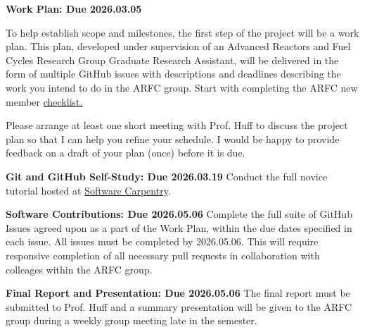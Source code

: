 \documentclass[11pt, answers]{exam}
\newcommand{\duedate}{2026.05.06}
\begin{document}
\begin{questions}
\addpoints
\question[10] \textbf{Work Plan: Due 2026.03.05}

To help establish scope and milestones, the first step of the project will be a 
        work plan. This plan, developed under supervision of an Advanced 
        Reactors and Fuel Cycles Research Group Graduate Research 
        Assistant, will be delivered in the form of multiple GitHub 
        issues with descriptions and deadlines describing the work you intend 
        to do in the ARFC group. Start with completing the ARFC new member 
        \href{https://github.com/orgs/arfc/projects/37/views/1}{checklist.}

Please arrange at least one short meeting with Prof. Huff to discuss the project plan
so that I can help you refine your schedule. I would be happy to provide feedback 
on a draft of your plan (once) before it is due.

\question[10] \textbf{Git and GitHub Self-Study: Due 2026.03.19}
        Conduct the full novice tutorial hosted at 
        \href{https://swcarpentry.github.io/git-novice/aio.html}{Software 
        Carpentry}.

\question[60] \textbf{Software Contributions: Due \duedate}
Complete the full suite of GitHub Issues agreed upon as a part of the Work 
        Plan, within the due dates specified in each issue. All issues must be 
        completed by \duedate. This will require responsive completion of all 
        necessary pull requests in  
        collaboration with colleages within the ARFC group. 

\question[20] \textbf{Final Report and Presentation: Due \duedate}
The final report must be submitted to Prof. Huff and a summary presentation 
        will be given to the ARFC group during a weekly group meeting late in 
        the semester. 

\end{questions}


%
%
\end{document}
